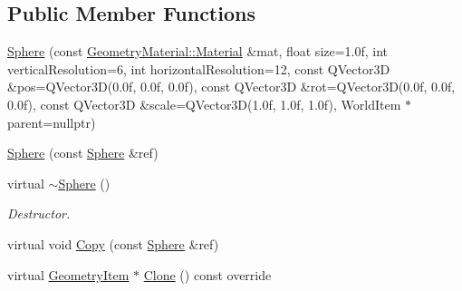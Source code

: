 \subsection*{Public Member Functions}
\begin{DoxyCompactItemize}
\item 
\mbox{\hyperlink{class_geometry_engine_1_1_geometry_world_item_1_1_geometry_item_1_1_sphere_a347e98690182023f565422548d4a6b9f}{Sphere}} (const \mbox{\hyperlink{class_geometry_engine_1_1_geometry_material_1_1_material}{Geometry\+Material\+::\+Material}} \&mat, float size=1.\+0f, int vertical\+Resolution=6, int horizontal\+Resolution=12, const Q\+Vector3\+D \&pos=\+Q\+Vector3\+D(0.\+0f, 0.\+0f, 0.\+0f), const Q\+Vector3\+D \&rot=\+Q\+Vector3\+D(0.\+0f, 0.\+0f, 0.\+0f), const Q\+Vector3\+D \&scale=\+Q\+Vector3\+D(1.\+0f, 1.\+0f, 1.\+0f), World\+Item $\ast$parent=nullptr)
\item 
\mbox{\hyperlink{class_geometry_engine_1_1_geometry_world_item_1_1_geometry_item_1_1_sphere_a65773e4801ab90a98d73a2905c785fd3}{Sphere}} (const \mbox{\hyperlink{class_geometry_engine_1_1_geometry_world_item_1_1_geometry_item_1_1_sphere}{Sphere}} \&ref)
\item 
\mbox{\label{class_geometry_engine_1_1_geometry_world_item_1_1_geometry_item_1_1_sphere_ab0adcc0d4a6213a5e6267e5930d6c9ce}} 
virtual \mbox{\hyperlink{class_geometry_engine_1_1_geometry_world_item_1_1_geometry_item_1_1_sphere_ab0adcc0d4a6213a5e6267e5930d6c9ce}{$\sim$\+Sphere}} ()
\begin{DoxyCompactList}\small\item\em Destructor. \end{DoxyCompactList}\item 
virtual void \mbox{\hyperlink{class_geometry_engine_1_1_geometry_world_item_1_1_geometry_item_1_1_sphere_a2124223c5454a1759f25ffad90157e06}{Copy}} (const \mbox{\hyperlink{class_geometry_engine_1_1_geometry_world_item_1_1_geometry_item_1_1_sphere}{Sphere}} \&ref)
\item 
virtual \mbox{\hyperlink{class_geometry_engine_1_1_geometry_world_item_1_1_geometry_item_1_1_geometry_item}{Geometry\+Item}} $\ast$ \mbox{\hyperlink{class_geometry_engine_1_1_geometry_world_item_1_1_geometry_item_1_1_sphere_aaf5b7221c60ac1feefaacff14a20c1f3}{Clone}} () const override
\end{DoxyCompactItemize}
